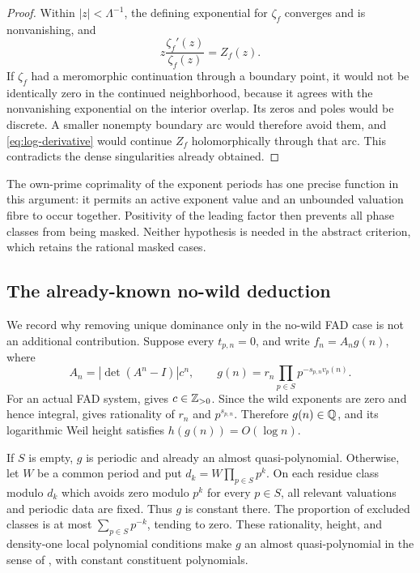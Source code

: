 \begin{proof}
Within \(|z|<\Lambda^{-1}\), the defining exponential for \(\zeta_f\)
converges and is nonvanishing, and
\begin{equation}\label{eq:log-derivative}
z\frac{\zeta_f'(z)}{\zeta_f(z)}=Z_f(z).
\end{equation}
If \(\zeta_f\) had a meromorphic continuation through a boundary point,
it would not be identically zero in the continued neighborhood, because
it agrees with the nonvanishing exponential on the interior overlap.
Its zeros and poles would be discrete. A smaller nonempty boundary
arc would therefore avoid them, and \eqref{eq:log-derivative} would
continue \(Z_f\) holomorphically through that arc. This contradicts
the dense singularities already obtained.
\end{proof}

The own-prime coprimality of the exponent periods has one precise
function in this argument: it permits an active exponent value and an
unbounded valuation fibre to occur together. Positivity of the leading
factor then prevents all phase classes from being masked.
Neither hypothesis is needed in the abstract criterion, which retains
the rational masked cases.

\subsection{The already-known no-wild deduction}

We record why removing unique dominance only in the no-wild FAD case
is not an additional contribution. Suppose every \(t_{p,n}=0\), and
write \(f_n=A_ng(n)\), where
\[
A_n=|\det(A^n-I)|c^n,\qquad
g(n)=r_n\prod_{p\in S}p^{-s_{p,n}v_p(n)}.
\]
For an actual FAD system, \citep[Proposition 10.2.1]{bch2024} gives
\(c\in\mathbb Z_{>0}\). Since the wild exponents are zero and hence integral,
\citep[Proposition 10.2.2]{bch2024} gives rationality of \(r_n\) and
\(p^{s_{p,n}}\). Therefore \(g(n)\in\mathbb Q\), and its logarithmic Weil height
satisfies \(h(g(n))=O(\log n)\).

If \(S\) is empty, \(g\) is periodic and already an almost
quasi-polynomial. Otherwise, let \(W\) be a common period and put
\(d_k=W\prod_{p\in S}p^k\).
On each residue class modulo \(d_k\) which avoids zero modulo
\(p^k\) for every \(p\in S\), all relevant valuations and periodic
data are fixed. Thus \(g\) is constant there. The proportion of
excluded classes is at most \(\sum_{p\in S}p^{-k}\), tending to zero.
These rationality, height, and density-one local polynomial conditions
make \(g\) an almost quasi-polynomial in the sense of
\citep[Definition 2.11]{bhn2025}, with constant constituent polynomials.


